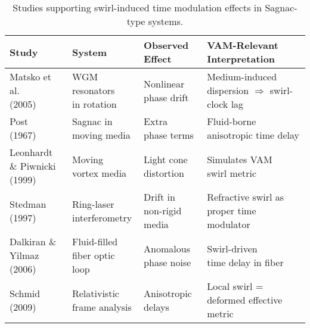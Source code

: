 \begin{table}[H]
    \centering
    \footnotesize
    \renewcommand{\arraystretch}{1.3}
    \begin{tabular}{|l|l|l|l|}
        \hline
        \textbf{Study} & \textbf{System} & \textbf{Observed Effect} & \textbf{VAM-Relevant Interpretation} \\
        \hline
        \makecell[l]{Matsko et al. \\ (2005) \cite{matsko2005}} &
        \makecell[l]{WGM resonators \\ in rotation} &
        \makecell[l]{Nonlinear \\ phase drift} &
        \makecell[l]{Medium-induced dispersion \\ $\Rightarrow$ swirl-clock lag} \\
        \hline
        \makecell[l]{Post \\ (1967) \cite{post1967}} &
        \makecell[l]{Sagnac in \\ moving media} &
        \makecell[l]{Extra \\ phase terms} &
        \makecell[l]{Fluid-borne \\ anisotropic time delay} \\
        \hline
        \makecell[l]{Leonhardt \& Piwnicki \\ (1999) \cite{leonhardt1999}} &
        \makecell[l]{Moving \\ vortex media} &
        \makecell[l]{Light cone \\ distortion} &
        \makecell[l]{Simulates VAM \\ swirl metric} \\
        \hline
        \makecell[l]{Stedman \\ (1997) \cite{stedman1997}} &
        \makecell[l]{Ring-laser \\ interferometry} &
        \makecell[l]{Drift in \\ non-rigid media} &
        \makecell[l]{Refractive swirl as \\ proper time modulator} \\
        \hline
        \makecell[l]{Dalkiran \& Yilmaz \\ (2006) \cite{dalkiran2006}} &
        \makecell[l]{Fluid-filled \\ fiber optic loop} &
        \makecell[l]{Anomalous \\ phase noise} &
        \makecell[l]{Swirl-driven \\ time delay in fiber} \\
        \hline
        \makecell[l]{Schmid \\ (2009) \cite{schmid2009}} &
        \makecell[l]{Relativistic \\ frame analysis} &
        \makecell[l]{Anisotropic \\ delays} &
        \makecell[l]{Local swirl = \\ deformed effective metric} \\
        \hline
    \end{tabular}
    \caption{Studies supporting swirl-induced time modulation effects in Sagnac-type systems.}
    \label{tab:sagnac-swirl}
\end{table}



